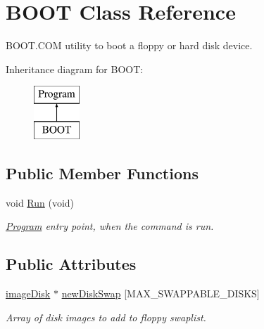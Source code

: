 \hypertarget{classBOOT}{\section{B\-O\-O\-T Class Reference}
\label{classBOOT}
}


B\-O\-O\-T.\-C\-O\-M utility to boot a floppy or hard disk device.  


Inheritance diagram for B\-O\-O\-T\-:\begin{figure}[H]
\begin{center}
\leavevmode
\includegraphics[height=2.000000cm]{classBOOT}
\end{center}
\end{figure}
\subsection*{Public Member Functions}
\begin{DoxyCompactItemize}
\item 
\hypertarget{classBOOT_a246ff7f80fc219360cdef4c3faa93d40}{void \hyperlink{classBOOT_a246ff7f80fc219360cdef4c3faa93d40}{Run} (void)}\label{classBOOT_a246ff7f80fc219360cdef4c3faa93d40}

\begin{DoxyCompactList}\small\item\em \hyperlink{classProgram}{Program} entry point, when the command is run. \end{DoxyCompactList}\end{DoxyCompactItemize}
\subsection*{Public Attributes}
\begin{DoxyCompactItemize}
\item 
\hypertarget{classBOOT_ab165a586fbff98d26e21fba090440209}{\hyperlink{classimageDisk}{image\-Disk} $\ast$ \hyperlink{classBOOT_ab165a586fbff98d26e21fba090440209}{new\-Disk\-Swap} \mbox{[}M\-A\-X\-\_\-\-S\-W\-A\-P\-P\-A\-B\-L\-E\-\_\-\-D\-I\-S\-K\-S\mbox{]}}\label{classBOOT_ab165a586fbff98d26e21fba090440209}

\begin{DoxyCompactList}\small\item\em Array of disk images to add to floppy swaplist. \end{DoxyCompactList}\end{DoxyCompactItemize}


